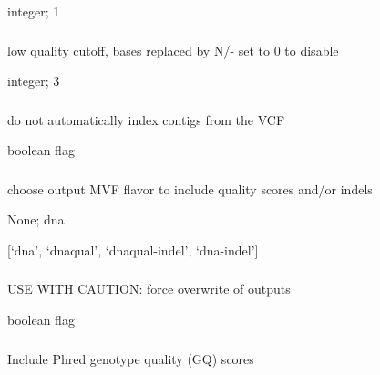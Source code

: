 \documentclass[letterpaper,11pt,english]{sphinxmanual}
\begin{document}
 integer;  1


\subsubsection{}
\label{\detokenize{prog_desc:mask-qual-maskqual}}
 low quality cutoff, bases replaced by N/- set to 0 to disable

 integer;  3


\subsubsection{}
\label{\detokenize{prog_desc:no-autoindex-noautoindex}}
 do not automatically index contigs from the VCF

 boolean flag


\subsubsection{}
\label{\detokenize{prog_desc:out-flavor-outflavor}}
 choose output MVF flavor to include quality scores and/or indels

 None;  dna

 {[}‘dna’, ‘dnaqual’, ‘dnaqual-indel’, ‘dna-indel’{]}


\subsubsection{}
\label{\detokenize{prog_desc:id38}}
 USE WITH CAUTION: force overwrite of outputs

 boolean flag


\subsubsection{}
\label{\detokenize{prog_desc:qual}}
 Include Phred genotype quality (GQ) scores
\end{document}
